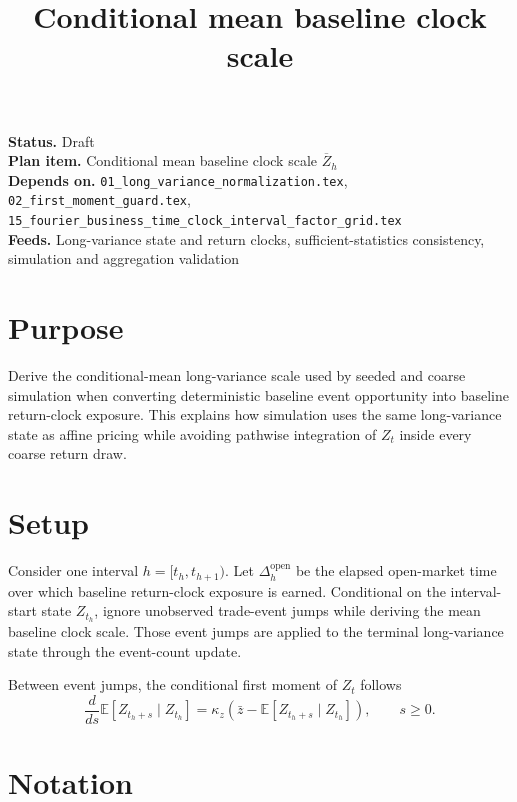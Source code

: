 \documentclass[11pt]{article}
\title{Conditional mean baseline clock scale}
\author{}
\date{}
\begin{document}
\maketitle

\noindent\textbf{Status.} Draft\\
\textbf{Plan item.} Conditional mean baseline clock scale \(\overline Z_h\)\\
\textbf{Depends on.} \texttt{01\_long\_variance\_normalization.tex},
\texttt{02\_first\_moment\_guard.tex},
\texttt{15\_fourier\_business\_time\_clock\_interval\_factor\_grid.tex}\\
\textbf{Feeds.} Long-variance state and return clocks, sufficient-statistics consistency, simulation and aggregation validation

\section{Purpose}

Derive the conditional-mean long-variance scale used by seeded and coarse
simulation when converting deterministic baseline event opportunity into
baseline return-clock exposure.
This explains how simulation uses the same long-variance state as affine
pricing while avoiding pathwise integration of \(Z_t\) inside every coarse
return draw.

\section{Setup}

Consider one interval \(h=[t_h,t_{h+1})\). Let \(\Delta_h^{\mathrm{open}}\) be the elapsed
open-market time over which baseline return-clock exposure is earned.
Conditional on the interval-start state \(Z_{t_h}\), ignore
unobserved trade-event jumps while deriving the mean baseline clock scale.
Those event jumps are applied to the terminal long-variance state through the
event-count update.

Between event jumps, the conditional first moment of \(Z_t\) follows
\[
    \frac{d}{ds}\mathbb E[Z_{t_h+s}\mid Z_{t_h}]
    =
    \kappa_z\left(\bar z-\mathbb E[Z_{t_h+s}\mid Z_{t_h}]\right),
    \qquad s\ge 0.
\]

\section{Notation}
\end{document}
